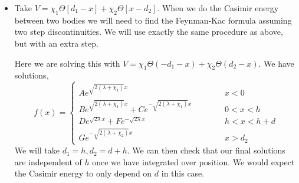 \begin{itemize}
  \item {Take $V=\chi_1\Theta[d_1-x]+\chi_2\Theta[x-d_2]$.}
    When we do the Casimir energy between two bodies we will need to find the Feynman-Kac formula assuming two step discontinuities.
    We will use exactly the same procedure as above, but with an extra step. 

    Here we are solving this with $V = \chi_1\Theta(-d_1-x) + \chi_2\Theta(d_2-x)$.
    We have solutions, 
    \begin{equation}
      f(x) = \left\{ \begin{array}{lcr}
          A e^{\sqrt{2(\lambda+\chi_1)}x}   & \hspace{1cm} & x<0\\
          B e^{\sqrt{2(\lambda+\chi_1)}x} + C e^{-\sqrt{2(\lambda+\chi_1)}x}  & \hspace{1cm} & 0<x<h\\
          D e^{\sqrt{2\lambda}x} + F e^{-\sqrt{2\lambda}x}  & \hspace{1cm} & h<x<h+d\\
          G e^{-\sqrt{2(\lambda+\chi_2)}x} & \hspace{1cm} & x>d_2
        \end{array}
      \right.
    \end{equation}
    We will take $d_1 = h, d_2 = d+h$.
    We can then check that our final solutions are independent of $h$ once we have integrated over position.
    We would expect the Casimir energy to only depend on $d$ in this case.   




\end{itemize}
